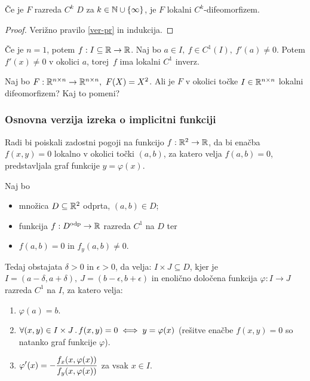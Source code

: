 \begin{posledica}
    Če je $F$ razreda $C^k$ \(D\) za $k \in \mathbb{N} \cup \left\{\infty\right\}$, je $F$ lokalni $C^k$-difeomorfizem.
\end{posledica}

\begin{proof}
    Verižno pravilo \ref{ver-pr} in indukcija.
\end{proof}

\begin{opomba}
    Če je $n=1$, potem $f: I \subseteq \mathbb{R} \to \mathbb{R}$. Naj bo $a \in I, \ f \in C^1(I), \ f'(a) \neq 0$. Potem $f'(x) \neq 0$ v okolici $a$, torej~$f$ ima lokalni $C^1$ inverz.
\end{opomba}

\begin{zgled}
    Naj bo $F: \mathbb{R}^{n \times n} \to \mathbb{R}^{n \times n}, \ F(X) = X^2$. Ali je $F$ v okolici točke $I \in \mathbb{R}^{n \times n}$ lokalni difeomorfizem? Kaj to pomeni?
\end{zgled}

\subsubsection{Osnovna verzija izreka o implicitni funkciji}
Radi bi poiskali zadostni pogoji na funkcijo $f: \mathbb{R}^2 \to \mathbb{R}$, da bi enačba $f(x, y) = 0$ lokalno v okolici točki $(a,b)$, za katero velja $f(a,b) = 0$, predstavljala graf funkcije $y = \varphi(x)$.

\begin{izrek}
    Naj bo 
    \begin{itemize}
        \item množica $D \subseteq \mathbb{R}^2$ odprta, $(a, b) \in D$;
        \item funkcija $f: D^\text{odp} \to \mathbb{R}$ razreda $ C^1$ na \(D\) ter
        \item \(f(a, b) = 0\) in \(f_y(a, b) \neq 0\).
    \end{itemize}
    Tedaj obstajata $\delta > 0$ in $\epsilon > 0$, da velja: $I \times J \subseteq D$, kjer je $I = (a - \delta, a + \delta), \ J = (b-\epsilon, b+\epsilon)$ in enolično določena funkcija $\varphi: I \to J$ razreda $C^1$ na \(I\), za katero velja:
    \begin{enumerate}
        \item $\varphi(a) = b$.
        \item $\forall (x,y) \in I \times J \,.\, f(x, y) = 0 \iff y = \varphi (x)$ (rešitve enačbe $f(x,y) = 0$ so natanko graf funkcije $\varphi$).
        \item $\displaystyle \varphi'(x) = -\frac{f_x(x, \varphi(x))}{f_y(x, \varphi(x))}$ za vsak $x \in I$.
    \end{enumerate}
\end{izrek}


